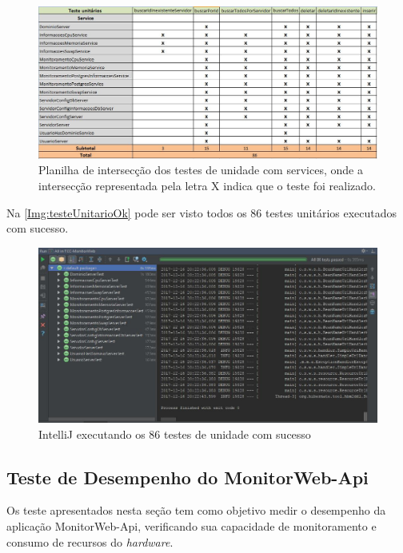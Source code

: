 \begin{figure}[H]
	\centering
	\includegraphics[width=1.0\textwidth]{figuras/MonitorWebApiTeste3/Teste3Planilha.jpg}
	\caption[Planilha de intersecção dos testes de unidade com services]{Planilha de intersecção dos testes de unidade com services, onde a intersecção representada pela letra X indica que o teste foi realizado.}
	\label{Img:PlanilhaTesteUnidade}
\end{figure}


Na \autoref{Img:testeUnitarioOk} pode ser visto todos os 86 testes unitários executados com sucesso.

\begin{figure}[H]
	\centering
	\includegraphics[width=1.0\textwidth]{figuras/MonitorWebApiTeste3/ResultadoTeste2.jpg}
	\caption[IntelliJ executando os 86 testes de unidade com sucesso]{IntelliJ executando os 86 testes de unidade com sucesso}
	\label{Img:testeUnitarioOk}
\end{figure}


\subsection{Teste de Desempenho do MonitorWeb-Api} \label{}

Os teste apresentados nesta seção tem como objetivo medir o desempenho da aplicação MonitorWeb-Api, verificando sua capacidade de monitoramento e consumo de recursos do \textit{hardware}.


